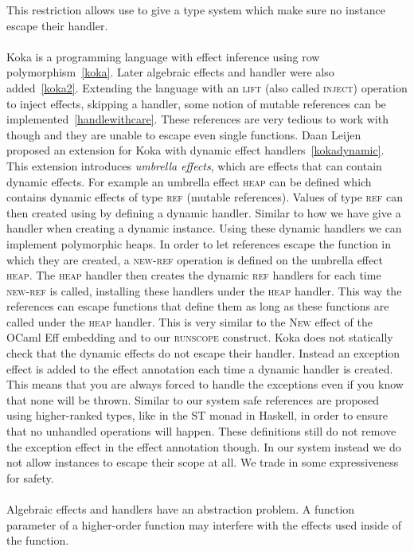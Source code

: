 This restriction allows use to give a type system which make sure no instance escape their handler.
\\\\
Koka is a programming language with effect inference using row polymorphism~\ref{koka}.
Later algebraic effects and handler were also added~\ref{koka2}.
Extending the language with an \textsc{lift} (also called \textsc{inject}) operation to inject effects, skipping a handler, some notion of mutable references can be implemented~\ref{handlewithcare}.
These references are very tedious to work with though and they are unable to escape even single functions.
Daan Leijen proposed an extension for Koka with dynamic effect handlers~\ref{kokadynamic}.
This extension introduces \emph{umbrella effects}, which are effects that can contain dynamic effects.
For example an umbrella effect \textsc{heap} can be defined which contains dynamic effects of type \textsc{ref} (mutable references).
Values of type \textsc{ref} can then created using by defining a dynamic handler.
Similar to how we have give a handler when creating a dynamic instance.
Using these dynamic handlers we can implement polymorphic heaps.
In order to let references escape the function in which they are created, a \textsc{new-ref} operation is defined on the umbrella effect \textsc{heap}.
The \textsc{heap} handler then creates the dynamic \textsc{ref} handlers for each time \textsc{new-ref} is called, installing these handlers under the \textsc{heap} handler.
This way the references can escape functions that define them as long as these functions are called under the \textsc{heap} handler.
This is very similar to the \textsc{New} effect of the OCaml Eff embedding and to our \textsc{runscope} construct.
Koka does not statically check that the dynamic effects do not escape their handler.
Instead an exception effect is added to the effect annotation each time a dynamic handler is created.
This means that you are always forced to handle the exceptions even if you know that none will be thrown.
Similar to our system safe references are proposed using higher-ranked types, like in the ST monad in Haskell, in order to ensure that no unhandled operations will happen.
These definitions still do not remove the exception effect in the effect annotation though.
In our system instead we do not allow instances to escape their scope at all.
We trade in some expressiveness for safety.
\\\\
Algebraic effects and handlers have an abstraction problem.
A function parameter of a higher-order function may interfere with the effects used inside of the function.
